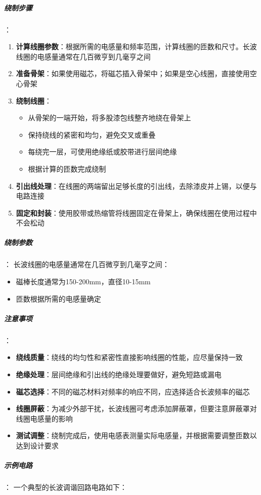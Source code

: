 \subparagraph{绕制步骤}：
\begin{enumerate}
    \item \textbf{计算线圈参数}：根据所需的电感量和频率范围，计算线圈的匝数和尺寸。长波线圈的电感量通常在几百微亨到几毫亨之间
    \item \textbf{准备骨架}：如果使用磁芯，将磁芯插入骨架中；如果是空心线圈，直接使用空心骨架
    \item \textbf{绕制线圈}：
    \begin{itemize}
        \item 从骨架的一端开始，将多股漆包线整齐地绕在骨架上
        \item 保持绕线的紧密和均匀，避免交叉或重叠
        \item 每绕完一层，可使用绝缘纸或胶带进行层间绝缘
        \item 根据计算的匝数完成绕制
    \end{itemize}
    \item \textbf{引出线处理}：在线圈的两端留出足够长度的引出线，去除漆皮并上锡，以便与电路连接
    \item \textbf{固定和封装}：使用胶带或热缩管将线圈固定在骨架上，确保线圈在使用过程中不会松动
\end{enumerate}

\subparagraph{绕制参数}：
长波线圈的电感量通常在几百微亨到几毫亨之间：
\begin{itemize}
    \item 磁棒长度通常为150-200mm，直径10-15mm
    \item 匝数根据所需的电感量确定
\end{itemize}

\subparagraph{注意事项}：
\begin{itemize}
    \item \textbf{绕线质量}：绕线的均匀性和紧密性直接影响线圈的性能，应尽量保持一致
    \item \textbf{绝缘处理}：层间绝缘和引出线的绝缘处理要做好，避免短路或漏电
    \item \textbf{磁芯选择}：不同的磁芯材料对频率的响应不同，应选择适合长波频率的磁芯
    \item \textbf{线圈屏蔽}：为减少外部干扰，长波线圈可考虑添加屏蔽罩，但要注意屏蔽罩对线圈电感量的影响
    \item \textbf{测试调整}：绕制完成后，使用电感表测量实际电感量，并根据需要调整匝数以达到设计要求
\end{itemize}

\subparagraph{示例电路}：
一个典型的长波调谐回路电路如下：

